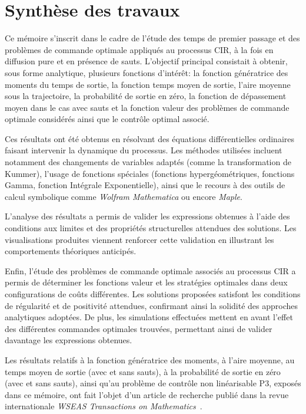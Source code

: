 \label{sec:Conclusion}
\section{Synthèse des travaux}

Ce mémoire s'inscrit dans le cadre de l'étude des temps de premier passage et des problèmes de commande optimale appliqués au processus \acs{CIR}, à la fois en diffusion pure et en présence de sauts. L'objectif principal consistait à obtenir, sous forme analytique, plusieurs fonctions d'intérêt: la fonction génératrice des moments du temps de sortie, la fonction temps moyen de sortie, l'aire moyenne sous la trajectoire, la probabilité de sortie en zéro, la fonction de dépassement moyen dans le cas avec sauts et la fonction valeur des problèmes de commande optimale considérés ainsi que le contrôle optimal associé.

Ces résultats ont été obtenus en résolvant des équations différentielles ordinaires faisant intervenir la dynamique du processus. Les méthodes utilisées incluent notamment des changements de variables adaptés (comme la transformation de Kummer), l'usage de fonctions spéciales (fonctions hypergéométriques, fonctions Gamma, fonction Intégrale Exponentielle), ainsi que le recours à des outils de calcul symbolique comme \textit{Wolfram Mathematica} ou encore \textit{Maple}.

L'analyse des résultats a permis de valider les expressions obtenues à l'aide des conditions aux limites et des propriétés structurelles attendues des solutions. Les visualisations produites viennent renforcer cette validation en illustrant les comportements théoriques anticipés.

Enfin, l'étude des problèmes de commande optimale associés au processus \acs{CIR} a permis de déterminer les fonctions valeur et les stratégies optimales dans deux configurations de coûts différentes. Les solutions proposées satisfont les conditions de régularité et de positivité attendues, confirmant ainsi la solidité des approches analytiques adoptées. De plus, les simulations effectuées mettent en avant l'effet des différentes commandes optimales trouvées, permettant ainsi de valider davantage les expressions obtenues.

Les résultats relatifs à la fonction génératrice des moments, à l'aire moyenne, au temps moyen de sortie (avec et sans sauts), à la probabilité de sortie en zéro (avec et sans sauts), ainsi qu'au problème de contrôle non linéarisable P3, exposés dans ce mémoire, ont fait l'objet d'un article de recherche publié dans la revue internationale \textit{WSEAS Transactions on Mathematics}~\cite{lefebvre2025}.

